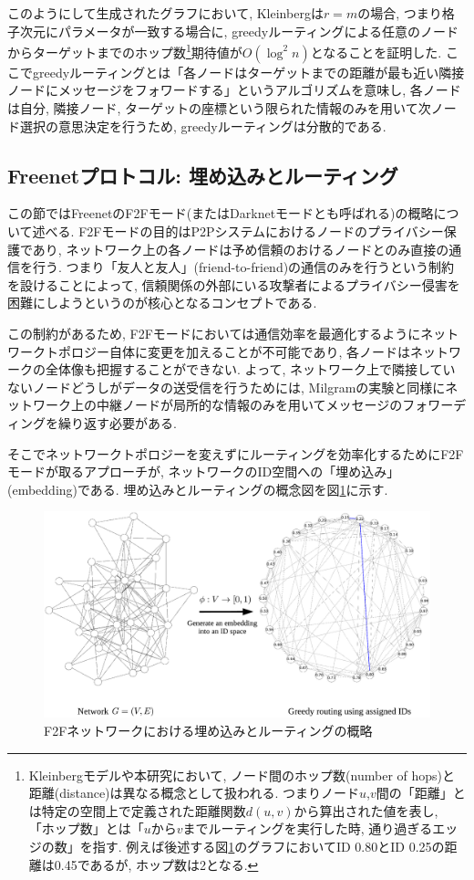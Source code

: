 \documentclass[dvipdfmx]{ampbt}
\begin{document}
   このようにして生成されたグラフにおいて, Kleinbergは$r=m$の場合, つまり格子次元にパラメータが一致する場合に, greedyルーティングによる任意のノードからターゲットまでのホップ数\footnote{Kleinbergモデルや本研究において, ノード間のホップ数(number of hops)と距離(distance)は異なる概念として扱われる. つまりノード$u$,$v$間の「距離」とは特定の空間上で定義された距離関数$d(u,v)$から算出された値を表し, 「ホップ数」とは「$u$から$v$までルーティングを実行した時, 通り過ぎるエッジの数」を指す. 例えば後述する図\ref{fig:f2f_overview}のグラフにおいてID 0.80とID 0.25の距離は0.45であるが, ホップ数は2となる.}期待値が$O(\log^2n)$となることを証明した. ここでgreedyルーティングとは「各ノードはターゲットまでの距離が最も近い隣接ノードにメッセージをフォワードする」というアルゴリズムを意味し, 各ノードは自分, 隣接ノード, ターゲットの座標という限られた情報のみを用いて次ノード選択の意思決定を行うため, greedyルーティングは分散的である.


   \subsection{Freenetプロトコル: 埋め込みとルーティング} \label{sec:freenetprotocols}
   この節ではFreenetのF2Fモード(またはDarknetモードとも呼ばれる)の概略について述べる. F2Fモードの目的はP2Pシステムにおけるノードのプライバシー保護であり, ネットワーク上の各ノードは予め信頼のおけるノードとのみ直接の通信を行う. つまり「友人と友人」(friend-to-friend)の通信のみを行うという制約を設けることによって, 信頼関係の外部にいる攻撃者によるプライバシー侵害を困難にしようというのが核心となるコンセプトである.

   この制約があるため, F2Fモードにおいては通信効率を最適化するようにネットワークトポロジー自体に変更を加えることが不可能であり, 各ノードはネットワークの全体像も把握することができない. よって, ネットワーク上で隣接していないノードどうしがデータの送受信を行うためには, Milgramの実験と同様にネットワーク上の中継ノードが局所的な情報のみを用いてメッセージのフォワーディングを繰り返す必要がある. 

   そこでネットワークトポロジーを変えずにルーティングを効率化するためにF2Fモードが取るアプローチが, ネットワークのID空間への「埋め込み」(embedding)である. 埋め込みとルーティングの概念図を図\ref{fig:f2f_overview}に示す.

   \begin{figure}[htbp]
    \centerline{\includegraphics[width=150mm]{../fig/greedy_embedding_overview.eps}}
    \caption{F2Fネットワークにおける埋め込みとルーティングの概略}
    \label{fig:f2f_overview}
   \end{figure}
\end{document}
